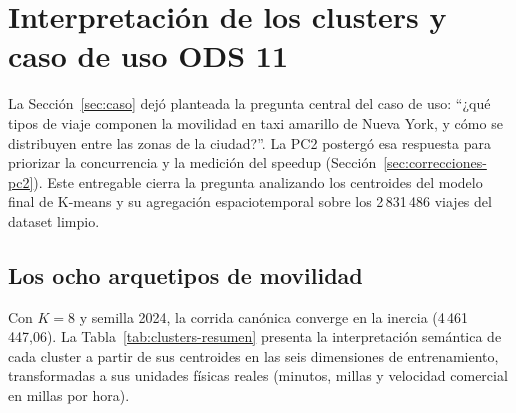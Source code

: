 \section{Interpretación de los clusters y caso de uso ODS 11}\label{sec:interpretacion-clusters}

La Sección~\ref{sec:caso} dejó planteada la pregunta central del caso de uso: \enquote{¿qué tipos
de viaje componen la movilidad en taxi amarillo de Nueva York, y cómo se distribuyen entre las zonas
de la ciudad?}. La PC2 postergó esa respuesta para priorizar la concurrencia y la medición del
speedup (Sección~\ref{sec:correcciones-pc2}). Este entregable cierra la pregunta analizando los
centroides del modelo final de K-means y su agregación espaciotemporal sobre los 2\,831\,486 viajes
del dataset limpio.

\subsection{Los ocho arquetipos de movilidad}

Con $K = 8$ y semilla 2024, la corrida canónica converge en la inercia 
(4\,461\,447{,}06). La Tabla~\ref{tab:clusters-resumen} presenta la interpretación semántica de cada
cluster a partir de sus centroides en las seis dimensiones de entrenamiento, transformadas a sus
unidades físicas reales (minutos, millas y velocidad comercial en millas por hora).

